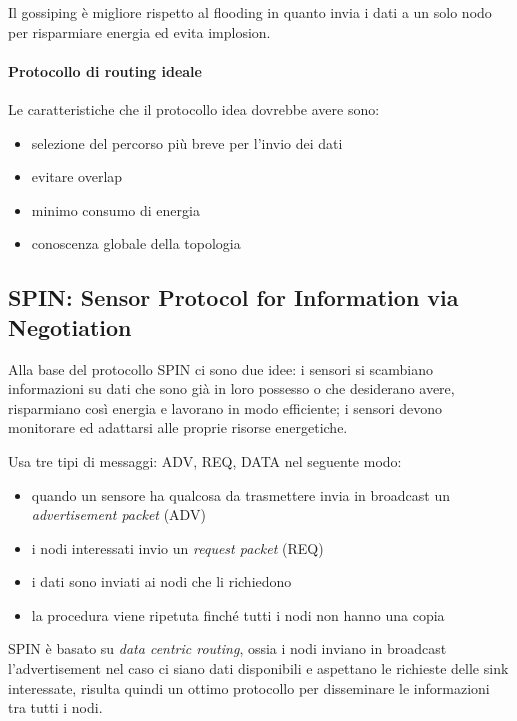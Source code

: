 	Il gossiping è migliore rispetto al flooding in quanto invia i dati a un solo nodo per risparmiare energia ed evita implosion.
	
\paragraph{Protocollo di routing ideale}
	
	Le caratteristiche che il protocollo idea dovrebbe avere sono:
	\begin{itemize}
		\item selezione del percorso più breve per l'invio dei dati
		\item evitare overlap
		\item minimo consumo di energia
		\item conoscenza globale della topologia
	\end{itemize}

\subsection{SPIN: Sensor Protocol for Information via Negotiation}

	Alla base del protocollo SPIN ci sono due idee: i sensori si scambiano informazioni su dati che sono già in loro possesso o che desiderano avere, risparmiano così energia e lavorano in modo efficiente; i sensori devono monitorare ed adattarsi alle proprie risorse energetiche.
	
	Usa tre tipi di messaggi: ADV, REQ, DATA nel seguente modo:
	\begin{itemize}
		\item quando un sensore ha qualcosa da trasmettere invia in broadcast un \emph{advertisement packet} (ADV)
		\item i nodi interessati invio un \emph{request packet} (REQ)
		\item i dati sono inviati ai nodi che li richiedono
		\item la procedura viene ripetuta finché tutti i nodi non hanno una copia
	\end{itemize}

	SPIN è basato su \emph{data centric routing}, ossia i nodi inviano in broadcast l'advertisement nel caso ci siano dati disponibili e aspettano le richieste delle sink interessate, risulta quindi un ottimo protocollo per disseminare le informazioni tra tutti i nodi.
	
	
	
	
	
	
	
	
